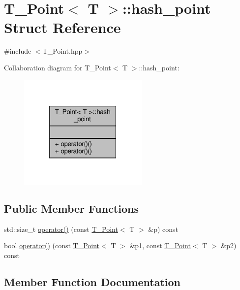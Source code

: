 \hypertarget{structT__Point_1_1hash__point}{}\section{T\+\_\+\+Point$<$ T $>$\+:\+:hash\+\_\+point Struct Reference}
\label{structT__Point_1_1hash__point}


{\ttfamily \#include $<$T\+\_\+\+Point.\+hpp$>$}



Collaboration diagram for T\+\_\+\+Point$<$ T $>$\+:\+:hash\+\_\+point\+:\nopagebreak
\begin{figure}[H]
\begin{center}
\leavevmode
\includegraphics[width=181pt]{structT__Point_1_1hash__point__coll__graph}
\end{center}
\end{figure}
\subsection*{Public Member Functions}
\begin{DoxyCompactItemize}
\item 
std\+::size\+\_\+t \hyperlink{structT__Point_1_1hash__point_a6d41490eb7af074b029db524a80e2e53}{operator()} (const \hyperlink{classT__Point}{T\+\_\+\+Point}$<$ T $>$ \&p) const
\item 
bool \hyperlink{structT__Point_1_1hash__point_a92f4c83c6538fcb66804d44e944d7b20}{operator()} (const \hyperlink{classT__Point}{T\+\_\+\+Point}$<$ T $>$ \&p1, const \hyperlink{classT__Point}{T\+\_\+\+Point}$<$ T $>$ \&p2) const
\end{DoxyCompactItemize}


\subsection{Member Function Documentation}
\mbox{\label{structT__Point_1_1hash__point_a6d41490eb7af074b029db524a80e2e53}} 
